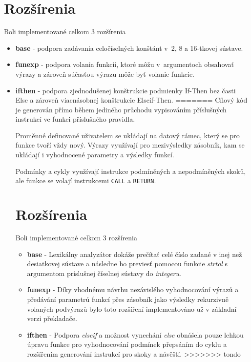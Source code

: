 \documentclass{article}
\begin{document}
    \section{Rozšírenia}
    Boli implementované celkom 3 rozšírenia
        \begin{itemize}
            \item \textbf{base}   - podpora zadávania celočíselných konštánt v~2, 8 a 16-tkovej sústave.
            \item \textbf{funexp} - podpora volania funkcií, ktoré môžu v~argumentoch obsahovať výrazy
                                        a zároveň súčasťou výrazu môže byť volanie funkcie.
            \item  \textbf{ifthen} - podpora zjednodušenej konštrukcie podmienky If-Then bez časti Else
                                        a zároveň viacnásobnej konštrukcie Elseif-Then.
=======
            Cílový kód je generován přímo během jediného průchodu vypisováním příslušných instrukcí ve funkci
            příslušného pravidla.
            
            Proměnné definované uživatelem se ukládají na datový rámec, který se pro funkce
            tvoří vždy nový.
            Výrazy využívají pro mezivýsledky zásobník, kam se ukládají i vyhodnocené parametry a výsledky funkcí.
            
            Podmínky a cykly využívají instrukce podmíněných a nepodmíněných skoků, ale funkce se volají instrukcemi \texttt{CALL}
            a \texttt{RETURN}.
        
    \section{Rozšírenia}
    Boli implementované celkom 3 rozšírenia
        \begin{itemize}
            \item \textbf{base}   - Lexikálny analyzátor dokáže prečítať celé číslo zadané v inej než
                                    desiatkovej sústave a následne ho previesť pomocou funkcie 
                                    \emph{strtol} s argumentom príslušnej číselnej sústavy do \emph{integeru}.
            \item \textbf{funexp} - Díky vhodnému návrhu nezávislého vyhodnocování výrazů a předávání parametrů funkcí
                                    přes zásobník jako výsledky rekurzivně volaných podvýrazů bylo toto rozšíření implementováno
                                    už v základní verzi překladače.
            \item \textbf{ifthen} - Podpora \emph{elseif} a možnost vynechání \emph{else} obnášela pouze lehkou úpravu funkce
                                    pro vyhodnocování podmínek přepsáním do cyklu a rozšířením generování instrukcí
                                    pro skoky a návěští.
>>>>>>> tondo
        \end{itemize}


\end{itemize}
\end{document}
